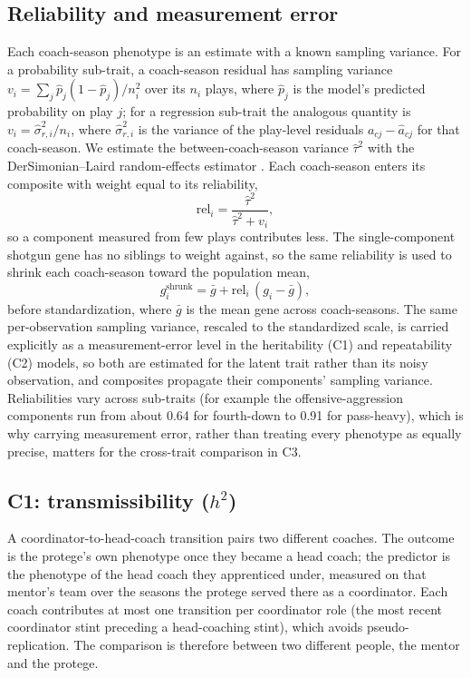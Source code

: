 \documentclass[
  journal=ehs,
  manuscript=article,
  year=2026,
  volume=8,
]{cup-journal}
\begin{document}
\subsection{Reliability and measurement error}
Each coach-season phenotype is an estimate with a known sampling variance. For a
probability sub-trait, a coach-season residual has sampling variance
$v_i = \sum_j \hat{p}_j(1-\hat{p}_j)/n_i^2$ over its $n_i$ plays, where $\hat{p}_j$ is
the model's predicted probability on play $j$; for a regression sub-trait the
analogous quantity is $v_i = \hat{\sigma}_{r,i}^2/n_i$, where $\hat{\sigma}_{r,i}^2$ is
the variance of the play-level residuals $a_{cj}-\hat{a}_{cj}$ for that coach-season.
We estimate the between-coach-season variance $\hat{\tau}^2$ with the DerSimonian--Laird
random-effects estimator \parencite{dersimonian1986}. Each coach-season enters its
composite with weight equal to its reliability,
\begin{equation}
  \mathrm{rel}_i = \frac{\hat{\tau}^2}{\hat{\tau}^2 + v_i},
\end{equation}
so a component measured from few plays contributes less. The single-component shotgun
gene has no siblings to weight against, so the same reliability is used to shrink each
coach-season toward the population mean,
\begin{equation}
  g_i^{\mathrm{shrunk}} = \bar{g} + \mathrm{rel}_i\,(g_i - \bar{g}),
\end{equation}
before standardization, where $\bar{g}$ is the mean gene across coach-seasons.
The same per-observation sampling variance, rescaled to the standardized scale, is
carried explicitly as a measurement-error level in the heritability (C1) and
repeatability (C2) models, so both are estimated for the latent trait rather than
its noisy observation, and composites propagate their components' sampling variance.
Reliabilities vary across sub-traits (for example the offensive-aggression
components run from about 0.64 for fourth-down to 0.91 for pass-heavy), which is why
carrying measurement error, rather than treating every phenotype as equally precise,
matters for the cross-trait comparison in C3.

\subsection{C1: transmissibility ($h^{2}$)}
A coordinator-to-head-coach transition pairs two different coaches. The outcome is
the protege's own phenotype once they became a head coach; the predictor is the
phenotype of the head coach they apprenticed under, measured on that mentor's team
over the seasons the protege served there as a coordinator. Each coach contributes
at most one transition per coordinator role (the most recent coordinator stint
preceding a head-coaching stint), which avoids pseudo-replication. The comparison is
therefore between two different people, the mentor and the protege.
\end{document}
